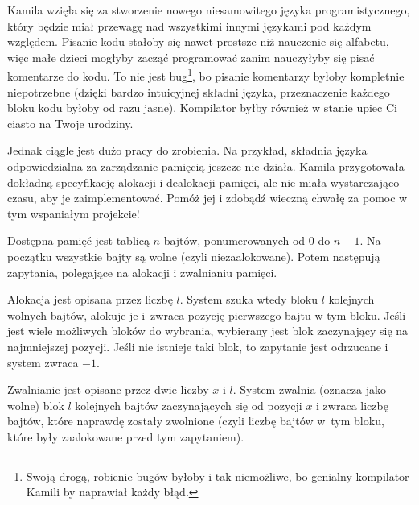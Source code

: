 

\usepackage[utf8]{inputenc}
\usepackage[T1]{fontenc}
\usepackage[polish]{babel}
\usepackage{polski}





Kamila wzięła się za stworzenie nowego niesamowitego języka programistycznego,
	który będzie miał przewagę nad wszystkimi innymi językami pod każdym względem.
Pisanie kodu stałoby się nawet prostsze niż nauczenie się alfabetu,
	więc małe dzieci mogłyby zacząć programować zanim nauczyłyby się pisać komentarze do kodu.
To nie jest bug\footnote{Swoją drogą, robienie bugów byłoby i tak niemożliwe,
	bo genialny kompilator Kamili by naprawiał każdy błąd.},
	bo pisanie komentarzy byłoby kompletnie niepotrzebne
	(dzięki bardzo intuicyjnej składni języka, przeznaczenie każdego bloku kodu byłoby od razu jasne).
Kompilator byłby również w stanie upiec Ci ciasto na Twoje urodziny.

Jednak ciągle jest dużo pracy do zrobienia.
Na przykład, składnia języka odpowiedzialna za zarządzanie pamięcią jeszcze nie działa.
Kamila przygotowała dokładną specyfikację alokacji i dealokacji pamięci,
	ale nie miała wystarczająco czasu, aby je zaimplementować.
Pomóż jej i zdobądź wieczną chwałę za pomoc w tym wspaniałym projekcie!


Dostępna pamięć jest tablicą $n$ bajtów, ponumerowanych od $0$ do $n-1$.
Na początku wszystkie bajty są wolne (czyli niezaalokowane).
Potem następują zapytania, polegające na alokacji i zwalnianiu pamięci.

Alokacja jest opisana przez liczbę $l$.
System szuka wtedy bloku $l$ kolejnych wolnych bajtów, alokuje je i~zwraca pozycję pierwszego bajtu w tym bloku.
Jeśli jest wiele możliwych bloków do wybrania, wybierany jest blok zaczynający się na najmniejszej pozycji.
Jeśli nie istnieje taki blok, to zapytanie jest odrzucane i system zwraca $-1$.

Zwalnianie jest opisane przez dwie liczby $x$ i $l$.
System zwalnia (oznacza jako wolne) blok $l$ kolejnych bajtów zaczynających się od pozycji $x$
	i zwraca liczbę bajtów, które naprawdę zostały zwolnione
	(czyli liczbę bajtów w~tym bloku, które były zaalokowane przed tym zapytaniem).

